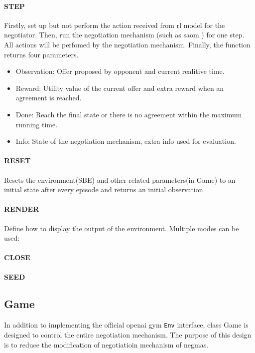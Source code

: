 \paragraph{STEP} Firstly, set up but not perform the action received from \gls{rl} model for the negotiator. Then, run the negotiation mechanism (such as \gls{saom} ) for one step. All actions will be perfomed by the negotiation mechanism. Finally, the function returns four parameters.

\begin{itemize}
	\item Observation: Offer proposed by opponent and current realitive time.
	\item Reward: Utility value of the current offer and extra reward when an agreement is reached.
	\item Done: Reach the final state or there is no agreement within the maximum running time.
	\item Info: State of the negotiation mechanism, extra info used for evaluation.
\end{itemize}

\paragraph{RESET} Resets the environment(SBE) and other related parameters(in Game) to an initial state after every episode and returns an initial observation.
\paragraph{RENDER} Define how to display the output of the environment. Multiple modes can be used: 

\paragraph{CLOSE}
\paragraph{SEED}

\subsection{Game} \label{game}
In addition to implementing the official \gls{openai gym} \texttt{Env} interface, class Game is designed to control the entire negotiation mechanism. The purpose of this design is to reduce the modification of negotiatioin mechanism of \gls{negmas}.

